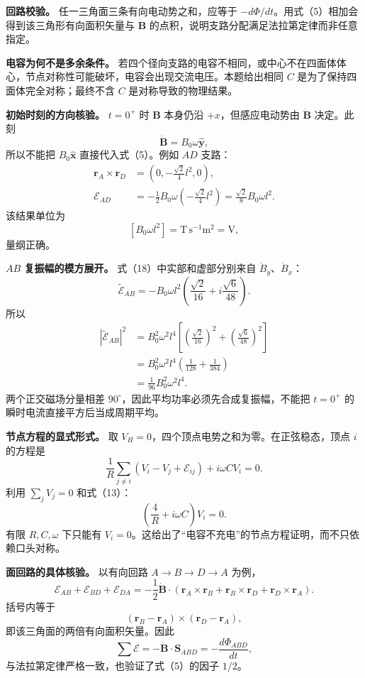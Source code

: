 \documentclass[12pt,a4paper,UTF8]{ctexart}
\begin{document}
\textbf{回路校验。} 任一三角面三条有向电动势之和，应等于
\(-d\Phi/dt\)。用式（5）相加会得到该三角形有向面积矢量与 \(\dot{\bm B}\)
的点积，说明支路分配满足法拉第定律而非任意指定。

\textbf{电容为何不是多余条件。}
若四个径向支路的电容不相同，或中心不在四面体体心，节点对称性可能破坏，电容会出现交流电压。本题给出相同
\(C\) 是为了保持四面体完全对称；最终不含 \(C\) 是对称导致的物理结果。

\textbf{初始时刻的方向核验。} \(t=0^+\) 时 \(\bm B\) 本身仍沿
\(+x\)，但感应电动势由 \(\dot{\bm B}\) 决定。此刻 \[
\dot{\bm B}=B_0\omega\hat{\bm y},
\] 所以不能把 \(B_0\hat{\bm x}\) 直接代入式（5）。例如 \(AD\) 支路： \[
\begin{aligned}
\bm r_A\times\bm r_D
&=\left(0,-\frac{\sqrt2}{4}l^2,0\right),\\
\mathcal E_{AD}
&=-\frac12B_0\omega
\left(-\frac{\sqrt2}{4}l^2\right)
=\frac{\sqrt2}{8}B_0\omega l^2.
\end{aligned}
\] 该结果单位为 \[
[B_0\omega l^2]
=\mathrm{T\,s^{-1}m^2}
=\mathrm{V},
\] 量纲正确。

\textbf{\(AB\) 复振幅的模方展开。} 式（18）中实部和虚部分别来自
\(\dot B_y\)、\(\dot B_x\)： \[
\widetilde{\mathcal E}_{AB}
=-B_0\omega l^2
\left(\frac{\sqrt2}{16}+i\frac{\sqrt6}{48}\right).
\] 所以 \[
\begin{aligned}
|\widetilde{\mathcal E}_{AB}|^2
&=B_0^2\omega^2l^4
\left[\left(\frac{\sqrt2}{16}\right)^2
+\left(\frac{\sqrt6}{48}\right)^2\right]\\
&=B_0^2\omega^2l^4
\left(\frac1{128}+\frac1{384}\right)\\
&=\frac1{96}B_0^2\omega^2l^4.
\end{aligned}
\] 两个正交磁场分量相差
\(90^\circ\)，因此平均功率必须先合成复振幅，不能把 \(t=0^+\)
的瞬时电流直接平方后当成周期平均。

\textbf{节点方程的显式形式。} 取
\(V_H=0\)，四个顶点电势之和为零。在正弦稳态，顶点 \(i\) 的方程是 \[
\frac1R\sum_{j\ne i}(V_i-V_j+\mathcal E_{ij})
+i\omega CV_i=0.
\] 利用 \(\sum_jV_j=0\) 和式（13）： \[
\left(\frac4R+i\omega C\right)V_i=0.
\] 有限 \(R,C,\omega\) 下只能有
\(V_i=0\)。这给出了``电容不充电''的节点方程证明，而不只依赖口头对称。

\textbf{面回路的具体核验。} 以有向回路 \(A\to B\to D\to A\) 为例， \[
\mathcal E_{AB}+\mathcal E_{BD}+\mathcal E_{DA}
=-\frac12\dot{\bm B}\cdot
\left(\bm r_A\times\bm r_B
+\bm r_B\times\bm r_D
+\bm r_D\times\bm r_A\right).
\] 括号内等于 \[
(\bm r_B-\bm r_A)\times(\bm r_D-\bm r_A),
\] 即该三角面的两倍有向面积矢量。因此 \[
\sum\mathcal E=-\dot{\bm B}\cdot\bm S_{ABD}
=-\frac{d\Phi_{ABD}}{dt},
\] 与法拉第定律严格一致，也验证了式（5）的因子 \(1/2\)。
\end{document}
